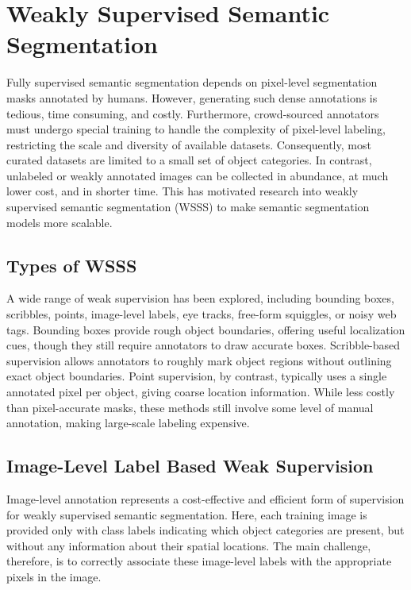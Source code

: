 \section{Weakly Supervised Semantic Segmentation}
\label{sec:weakly-supervised}
Fully supervised semantic segmentation depends on pixel-level segmentation masks annotated by humans. However, generating such dense annotations is tedious, time consuming, and costly. Furthermore, crowd-sourced annotators must undergo special training to handle the complexity of pixel-level labeling, restricting the scale and diversity of available datasets. Consequently, most curated datasets are limited to a small set of object categories. In contrast, unlabeled or weakly annotated images can be collected in abundance, at much lower cost, and in shorter time. This has motivated research into weakly supervised semantic segmentation (WSSS) to make semantic segmentation models more scalable.


\subsection{Types of WSSS}
\label{subsec:types-weakly-supervised}
A wide range of weak supervision has been explored, including bounding boxes, scribbles, points, image-level labels,  eye tracks, free-form squiggles, or noisy web tags. Bounding boxes provide rough object boundaries, offering useful localization cues, though they still require annotators to draw accurate boxes.  Scribble-based supervision allows annotators to roughly mark object regions without outlining exact object boundaries. Point supervision, by contrast, typically uses a single annotated pixel per object, giving coarse location information. While less costly than pixel-accurate masks, these methods still involve some level of manual annotation, making large-scale labeling expensive.


\subsection{Image-Level Label Based Weak Supervision}
\label{subsec:image-level-label}
Image-level annotation represents a cost-effective and efficient form of supervision for weakly supervised semantic segmentation. Here, each training image is provided only with class labels indicating which object categories are present, but without any information about their spatial locations. The main challenge, therefore, is to correctly associate these image-level labels with the appropriate pixels in the image.

